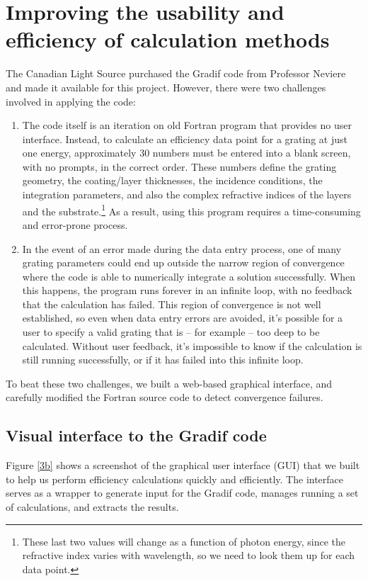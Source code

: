\section{Improving the usability and efficiency of calculation methods}
The Canadian Light Source purchased the Gradif code from Professor Neviere and made it available for this project.  However, there were two challenges involved in applying the code:
\begin{enumerate}
\item The code itself is an iteration on old Fortran program that provides no user interface.  Instead, to calculate an efficiency data point for a grating at just one energy, approximately 30 numbers must be entered into a blank screen, with no prompts, in the correct order.  These numbers define the grating geometry, the coating/layer thicknesses, the incidence conditions, the integration parameters, and also the complex refractive indices of the layers and the substrate.\footnote{These last two values will change as a function of photon energy, since the refractive index varies with wavelength, so we need to look them up for each data point.}  As a result, using this program requires a time-consuming and error-prone process.
\item In the event of an error made during the data entry process, one of many grating parameters could end up outside the narrow region of convergence where the code is able to  numerically integrate a solution successfully.  When this happens, the program runs forever in an infinite loop, with no feedback that the calculation has failed.  This region of convergence is not well established, so even when data entry errors are avoided, it's possible for a user to specify a valid grating that is -- for example -- too deep to be calculated.  Without user feedback, it's impossible to know if the calculation is still running successfully, or if it has failed into this infinite loop.
\end{enumerate}
To beat these two challenges, we built a web-based graphical interface, and carefully modified the Fortran source code to detect convergence failures.
\subsection{Visual interface to the Gradif code}
Figure \ref{3b} shows a screenshot of the graphical user interface (GUI) that we built to help us perform efficiency calculations quickly and efficiently.  The interface serves as a wrapper to generate input for the Gradif code, manages running a set of calculations, and extracts the results.

